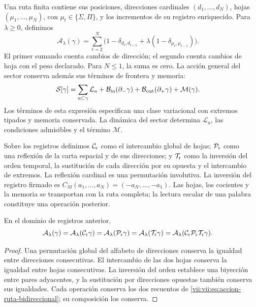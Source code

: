 Una ruta finita contiene sus posiciones, direcciones cardinales
\((d_1,\ldots,d_N)\), hojas \((\mu_1,\ldots,\mu_N)\), con
\(\mu_t\in\{\Sigma,\Pi\}\), y los incrementos de su registro
enriquecido. Para \(\lambda\geq0\), definimos
\begin{equation}
 \mathcal A_\lambda(\gamma)
 =\sum_{t=2}^N
 \bigl(1-\delta_{d_t,d_{t-1}}
       +\lambda(1-\delta_{\mu_t,\mu_{t-1}})\bigr).
 \label{vii:vii:eq:accion-ruta-bidireccional}
\end{equation}
El primer sumando cuenta cambios de dirección; el segundo cuenta cambios
de hoja con el peso declarado. Para \(N\leq1\), la suma es cero.
La acción general del sector conserva además sus términos de frontera y
memoria:
\begin{equation}
 \mathcal S[\gamma]
 =\sum_{a\subset\gamma}\mathcal L_a
  +\mathcal B_{\rm in}(\partial_-\gamma)
  +\mathcal B_{\rm out}(\partial_+\gamma)
  +\mathcal M(\gamma).
 \label{vii:vii:eq:accion-enriquecida-frontera}
\end{equation}
Los términos de esta expresión especifican una clase variacional con
extremos tipados y memoria conservada. La dinámica del sector determina
\(\mathcal L_a\), las condiciones admisibles y el término \(\mathcal M\).

Sobre los registros definimos \(\mathcal C_{\rm r}\) como el intercambio
global de hojas; \(\mathcal P_{\rm r}\) como una reflexión de la carta
espacial y de sus direcciones; y \(\mathcal T_{\rm r}\) como la inversión
del orden temporal, la sustitución de cada dirección por su opuesta y el
intercambio de extremos. La reflexión cardinal es una permutación involutiva.
La inversión del registro firmado es
\(C_M(a_1,\ldots,a_N)=(-a_N,\ldots,-a_1)\).
Las hojas, los cocientes y la memoria se transportan con la ruta completa;
la lectura escalar de una palabra constituye una operación posterior.

\begin{proposition}
\label{vii:vii:prop:invariancia-ruta-bidireccional}
En el dominio de registros anterior,
\[
 \mathcal A_\lambda(\gamma)
 =\mathcal A_\lambda(\mathcal C_{\rm r}\gamma)
 =\mathcal A_\lambda(\mathcal P_{\rm r}\gamma)
 =\mathcal A_\lambda(\mathcal T_{\rm r}\gamma)
 =\mathcal A_\lambda(\mathcal C_{\rm r}\mathcal P_{\rm r}
                              \mathcal T_{\rm r}\gamma).
\]
\end{proposition}
\begin{proof}
Una permutación global del alfabeto de direcciones conserva la igualdad
entre direcciones consecutivas. El intercambio de las dos hojas conserva
la igualdad entre hojas consecutivas. La inversión del orden establece una
biyección entre pares adyacentes, y la sustitución por direcciones opuestas
también conserva sus igualdades. Cada operación conserva los dos recuentos
de \eqref{vii:vii:eq:accion-ruta-bidireccional}; su composición los conserva.
\end{proof}

